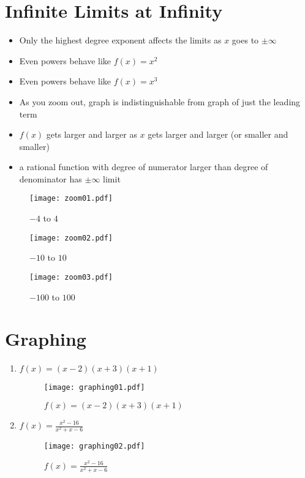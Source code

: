 \documentclass[letterpaper]{exam}
\begin{document}
  \newpage

  \section{Infinite Limits at Infinity}
  \begin{itemize}
    \item Only the highest degree exponent affects the limits as $x$ goes to $\pm \infty$

    \item Even powers behave like $f(x) = x^2$

    \item Even powers behave like $f(x) = x^3$

    \item As you zoom out, graph is indistinguishable from graph of just the leading term

    \item $f(x)$ gets larger and larger as $x$ gets larger and larger (or smaller and smaller)

    \item a rational function with degree of numerator larger than degree of denominator
      has $\pm \infty$ limit

  \end{itemize}

  \begin{figure}[H]
    \centering
    \texttt{[image: zoom01.pdf]}
    \caption{$-4$ to $4$}
    \label{fig:zoom01}
  \end{figure}

  \begin{figure}[H]
    \centering
    \texttt{[image: zoom02.pdf]}
    \caption{$-10$ to $10$}
    \label{fig:zoom02}
  \end{figure}

  \begin{figure}[H]
    \centering
    \texttt{[image: zoom03.pdf]}
    \caption{$-100$ to $100$}
    \label{fig:zoom03}
  \end{figure}

  \section{Graphing}

  \begin{enumerate}
    \item 
      $f(x) = (x - 2)(x + 3)(x + 1)$ 
      \begin{figure}[H]
        \centering
        \texttt{[image: graphing01.pdf]}
        \caption{$f(x) = (x - 2)(x + 3)(x + 1)$}
        \label{fig:graphing01}
      \end{figure}

    \item
      $f(x) = \frac{x^2-16}{x^2+x-6}$
      \begin{figure}[H]
        \centering
        \texttt{[image: graphing02.pdf]}
        \caption{$f(x) = \frac{x^2-16}{x^2+x-6}$}
        \label{fig:graphing02}
      \end{figure}
  \end{enumerate}
\end{document}
